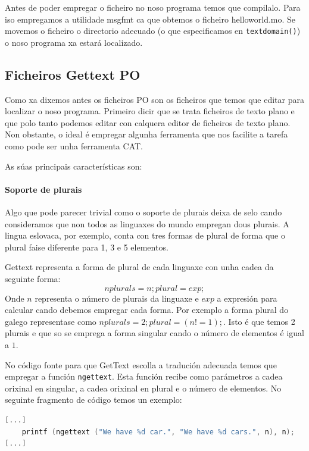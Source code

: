 Antes de poder empregar o ficheiro no noso programa temos que compilalo. Para iso empregamos a utilidade msgfmt ca que obtemos o ficheiro helloworld.mo. Se movemos o ficheiro o directorio adecuado (o que especificamos en \lstinline{textdomain()}) o noso programa xa estará localizado.


\subsection{Ficheiros Gettext PO}
Como xa dixemos antes os ficheiros PO son os ficheiros que temos que editar para localizar o noso programa. Primeiro dicir que se trata ficheiros de texto plano e que polo tanto podemos editar con calquera editor de ficheiros de texto plano. Non obstante, o ideal é empregar algunha ferramenta que nos facilite a tarefa como pode ser unha ferramenta CAT.

As súas principais características son:

\paragraph{Soporte de plurais}
Algo que pode parecer trivial como o soporte de plurais deixa de selo cando consideramos que non todos as linguaxes do mundo empregan dous plurais. A lingua eslovaca, por exemplo, conta con tres formas de plural de forma que o plural faise diferente para 1, 3 e 5 elementos.

Gettext representa a forma de plural de cada linguaxe con unha cadea da seguinte forma: $$nplurals=n; plural=exp;$$ Onde $n$ representa o número de plurais da linguaxe e $exp$ a expresión para calcular cando debemos empregar cada forma. Por exemplo a forma plural do galego representase como $nplurals=2; plural=(n != 1);$. Isto é que temos 2 plurais e que so se emprega a forma singular cando o número de elementos é igual a $1$.

No código fonte para que GetText escolla a tradución adecuada temos que empregar a función \lstinline{ngettext}. Esta función recibe como parámetros a cadea orixinal en singular, a cadea orixinal en plural e o número de elementos. No seguinte fragmento de código temos un exemplo:

\begin{lstlisting}[language=C,caption=Plurais en GetText (Código Fonte).]
[...]
    printf (ngettext ("We have %d car.", "We have %d cars.", n), n);
[...]
\end{lstlisting}

